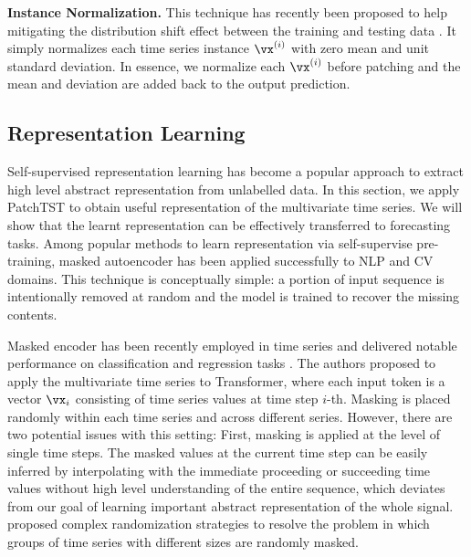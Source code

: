 \documentclass{article} %
\begin{document}
\textbf{Instance Normalization.} This technique has recently been proposed to help mitigating the distribution shift effect between the training and testing data \citep{instance,revin}. It simply normalizes each time series instance $\vx^{(i)}$ with zero mean and unit standard deviation. In essence, we normalize each $\vx^{(i)}$ before patching and the mean and deviation are added back to the output prediction.   

\subsection{Representation Learning}
\label{subsec::representation learning}

Self-supervised representation learning has become a popular approach to extract high level abstract representation from unlabelled data. In this section, we apply PatchTST to obtain useful representation of the multivariate time series. We will show that the learnt representation can be effectively transferred to forecasting tasks. Among popular methods to learn representation via self-supervise pre-training, masked autoencoder has been applied successfully to NLP \citep{bert} and CV \citep{mae} domains. This technique is conceptually simple: a portion of input sequence is intentionally removed at random and the model is trained to recover the missing contents. 


Masked encoder has been recently employed in time series and delivered notable performance on classification and regression tasks \citep{tst}. The authors proposed to apply the multivariate time series to Transformer, where each input token is a vector $\vx_i$ consisting of time series values at time step $i$-th. Masking is placed randomly within each time series and across different series. However, there are two potential issues with this setting: First, masking is applied at the level of single time steps. The masked values at the current time step can be easily inferred by interpolating with the immediate proceeding or succeeding time values without high level understanding of the entire sequence, which deviates from our goal of learning important abstract representation of the whole signal. \citet{tst} proposed complex randomization strategies to resolve the problem in which groups of time series with different sizes are randomly masked. 

\end{document}
